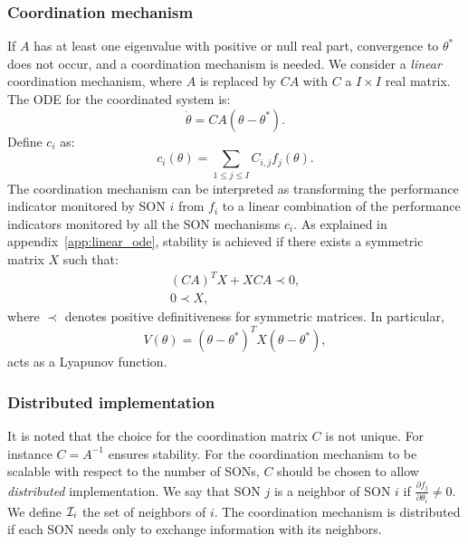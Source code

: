 \documentclass[10pt,conference,letterpaper]{IEEEtran}
\begin{document}
\subsubsection{Coordination mechanism}
	If $A$ has at least one eigenvalue with positive or null real part, convergence to $\theta^*$ does not occur, and a coordination mechanism is needed. We consider a \emph{linear} coordination mechanism, where $A$ is replaced by $C A$ with $C$ a $I \times I$ real matrix. The \ac{ODE} for the coordinated system is:
\begin{equation}\label{eq:son_linear_ode_coord}
	\dot{\theta} = C A (\theta - \theta^*).
\end{equation}
	 Define $c_i$ as:
\begin{equation}\label{eq:son_coord_kpi}
	c_i(\theta) =  \sum_{1 \leq j \leq I} C_{i,j} f_j(\theta).
\end{equation}
	The coordination mechanism can be interpreted as transforming the performance indicator monitored by \ac{SON} $i$ from $f_i$ to a linear combination of the performance indicators monitored by all the \ac{SON} mechanisms $c_i$. As explained in appendix~\ref{app:linear_ode}, stability is achieved if there exists a symmetric matrix $X$  such that:
\begin{align}
	(C  A)^T X + X C A \prec 0,\\
	0 \prec X,
\end{align}
where $\prec$ denotes positive definitiveness for symmetric matrices. In particular, 
\begin{equation} 
V(\theta) = (\theta - \theta^*)^T X (\theta - \theta^*),
\end{equation} 
acts as a Lyapunov function.
\subsubsection{Distributed implementation}	
	It is noted that the choice for the coordination matrix $C$ is not unique. For instance $C = A^{-1}$ ensures stability. For the coordination mechanism to be scalable with respect to the number of \acp{SON}, $C$ should be chosen to allow \emph{distributed} implementation. We say that \ac{SON} $j$ is a neighbor of \ac{SON} $i$ if $\frac{\partial f_j}{\partial \theta_i} \neq 0$. We define ${\cal I}_i$ the set of neighbors of $i$. The coordination mechanism is distributed if each \ac{SON} needs only to exchange information with its neighbors.
	
\end{document}

